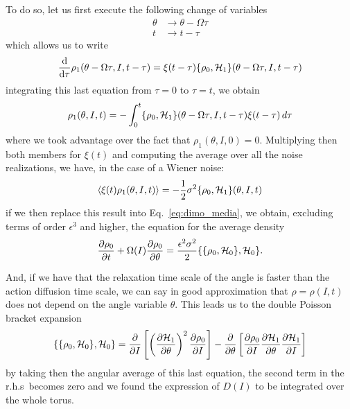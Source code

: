 To do so, let us first execute the following change of variables
\begin{equation}
	\begin{aligned}
		\theta &\to \theta - \Omega \tau \\
		t &\to t - \tau
	\end{aligned}		
\end{equation}
which allows us to write
\begin{equation}
	\dv{}{\tau}\/\rho_1(\theta - \Omega \tau, I, t - \tau) = \xi(t- \tau)\{\rho_0, \mathcal{H}_1\}(\theta - \Omega \tau, I, t - \tau)
\end{equation}
integrating this last equation from \(\tau = 0\) to \(\tau = t\), we obtain
\begin{equation}
	\rho_1(\theta, I, t) = -\int_0^t\{\rho_0, \mathcal{H}_1\}(\theta - \Omega \tau, I, t - \tau)\xi(t-\tau)\,d\tau
\end{equation}
where we took advantage over the fact that \(\rho_1(\theta, I, 0)=0\). Multiplying then both members for \(\xi(t)\) and computing the average over all the noise realizations, we have, in the case of a Wiener noise:
\begin{equation}
	\langle \xi(t)\rho_1(\theta, I, t) \rangle = -\frac{1}{2}\sigma^2 \{\rho_0, \mathcal{H}_1\}(\theta, I, t)
\end{equation}
if we then replace this result into Eq.~\eqref{eq:dimo_media}, we obtain, excluding terms of order \(\epsilon^3\) and higher, the equation for the average density
\begin{equation}
 	\pdv{\rho_0}{t}\/ + \Omega (I) \pdv{\rho_0}{\theta}\/ = \frac{\epsilon^2 \sigma^2}{2}\{\{\rho_0, \mathcal{H}_0\}, \mathcal{H}_0\}.
\end{equation}

And, if we have that the relaxation time scale of the angle is faster than the action diffusion time scale, we can say in good approximation that \(\rho=\rho(I,t)\) does not depend on the angle variable \(\theta\). This leads us to the double Poisson bracket expansion
\begin{equation}
	\{\{\rho_0, \mathcal{H}_0\}, \mathcal{H}_0\} = \pdv{}{I}\/\left[\left(\pdv{\mathcal{H}_1}{\theta}\/\right)^2 \pdv{\rho_0}{I}\/\right] - \pdv{}{\theta}\/\left[\pdv{\rho_0}{I}\/\pdv{\mathcal{H}_1}{\theta}\/\pdv{\mathcal{H}_1}{I}\/\right]
\end{equation}
by taking then the angular average of this last equation, the second term in the r.h.s\ becomes zero and we found the expression of \(D(I)\) to be integrated over the whole torus.

